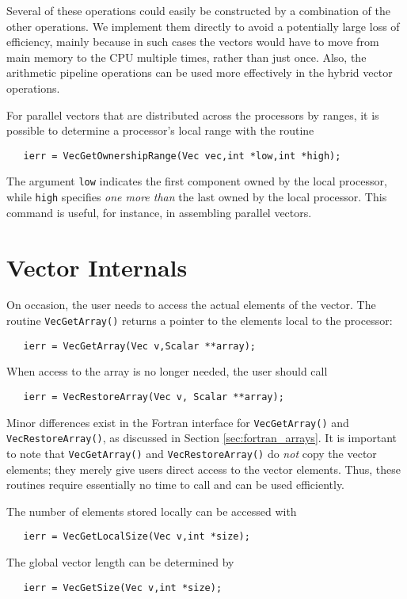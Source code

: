 Several of these operations could easily be constructed by a
combination of the other operations.  We implement them directly to
avoid a potentially large loss of efficiency, mainly because in such
cases the vectors would have to move from main memory to the CPU
multiple times, rather than just once.  Also, the arithmetic pipeline
operations can be used more effectively in the hybrid vector
operations.

For parallel vectors that are distributed across the processors by ranges, 
it is possible to determine 
a processor's local range with the routine
\begin{verbatim}
   ierr = VecGetOwnershipRange(Vec vec,int *low,int *high);
\end{verbatim}
The argument {\tt low} indicates the first component owned by the local 
processor, while {\tt high} specifies {\em one more than} the 
last owned by the local processor.
This command is useful, for instance, in assembling parallel vectors.

\section{Vector Internals}
\label{sec:vecinternal}

On occasion, the user needs to access the actual elements of the vector. 
The routine {\tt VecGetArray()} 
returns a pointer to the elements local to the processor:
\begin{verbatim}
   ierr = VecGetArray(Vec v,Scalar **array);
\end{verbatim}
When access to the array is no longer
needed, the user should call
\begin{verbatim}
   ierr = VecRestoreArray(Vec v, Scalar **array);
\end{verbatim}
Minor differences exist in the Fortran interface for {\tt VecGetArray()} and 
{\tt VecRestoreArray()}, as discussed in Section \ref{sec:fortran_arrays}.  
It is important to note that {\tt VecGetArray()} and {\tt VecRestoreArray()}
do {\em not} copy the vector elements; they merely give users direct
access to the vector elements. Thus, these routines require essentially
no time to call and can be used efficiently.

The number of elements stored locally can be accessed with
\begin{verbatim}
   ierr = VecGetLocalSize(Vec v,int *size);
\end{verbatim}
The global vector length can be determined by 
\begin{verbatim}
   ierr = VecGetSize(Vec v,int *size);
\end{verbatim}
 
